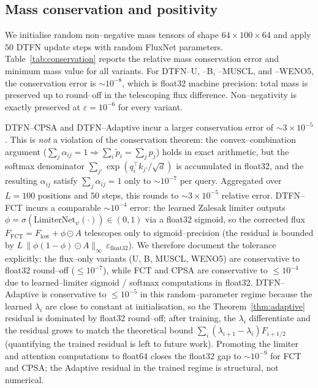 \documentclass[10pt]{article}
\theoremstyle{definition}
\theoremstyle{remark}
\newcommand{\Eps}{\varepsilon}
\begin{document}
\subsection{Mass conservation and positivity}
\label{sec:exp-conservation}

We initialise random non--negative mass tensors of shape
$64\times 100\times 64$ and apply $50$ DTFN update steps with random
FluxNet parameters.  Table~\ref{tab:conservation} reports the relative
mass conservation error and minimum mass value for all variants.  For
DTFN--U, --B, --MUSCL, and --WENO5, the conservation error is
$\sim 10^{-8}$, which is float32 machine precision: total mass is
preserved up to round--off in the telescoping flux difference.
Non--negativity is exactly preserved at $\Eps=10^{-6}$ for every
variant.

DTFN--CPSA and DTFN--Adaptive incur a larger conservation error of
$\sim 3\times 10^{-5}$.  This is \emph{not} a violation of the
conservation theorem: the convex--combination argument
($\sum_j \alpha_{ij}=1 \Rightarrow \sum_i \tilde p_i = \sum_j p_j$)
holds in exact arithmetic, but the softmax denominator
$\sum_{j'} \exp(q_i^\top k_{j'}/\sqrt{d})$ is accumulated in float32,
and the resulting $\alpha_{ij}$ satisfy $\sum_j \alpha_{ij} = 1$ only
to $\sim 10^{-7}$ per query.  Aggregated over $L=100$ positions and
$50$ steps, this rounds to $\sim 3\times 10^{-5}$ relative error.
DTFN--FCT incurs a comparable $\sim 10^{-4}$ error: the learned
Zalesak limiter outputs $\phi = \sigma(\mathrm{LimiterNet}_\psi(\cdot))
\in (0,1)$ via a float32 sigmoid, so the corrected flux
$F_{\mathrm{FCT}} = F_{\mathrm{low}} + \phi \odot A$ telescopes only
to sigmoid--precision (the residual is bounded by
$L\,\|\phi(1-\phi)\odot A\|_\infty\,\varepsilon_{\mathrm{float32}}$).
We therefore document the tolerance explicitly: the flux--only
variants (U, B, MUSCL, WENO5) are conservative to float32 round--off
($\le 10^{-7}$), while FCT and CPSA are conservative to
$\le 10^{-4}$ due to learned--limiter sigmoid / softmax computations
in float32.  DTFN--Adaptive is conservative to $\le 10^{-5}$ in this
random--parameter regime because the learned $\lambda_i$ are close
to constant at initialisation, so the Theorem~\ref{thm:adaptive}
residual is dominated by float32 round--off; after training, the
$\lambda_i$ differentiate and the residual grows to match the
theoretical bound $\sum_i (\lambda_{i+1}-\lambda_i) F_{i+1/2}$
(quantifying the trained residual is left to future work).
Promoting the limiter and attention computations to float64 closes
the float32 gap to $\sim 10^{-9}$ for FCT and CPSA; the Adaptive
residual in the trained regime is structural, not numerical.
\end{document}
